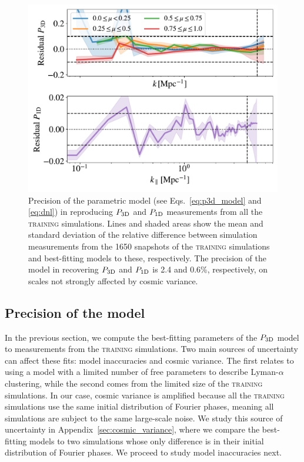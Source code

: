 \documentclass{aa}
\newcommand{\lya}{Lyman-$\alpha$\xspace}
\newcommand{\poned}{\ensuremath{P_{\rm 1D}}\xspace}
\newcommand{\pthreed}{\ensuremath{P_{\rm 3D}}\xspace}
\newcommand{\lacehc}{\textsc{training}\xspace}
\begin{document}
\begin{figure}
\includegraphics[width=\columnwidth]{figures/goodness_fit_all.pdf}
\centering
\caption{Precision of the parametric model (see Eqs.~\ref{eq:p3d_model} and \ref{eq:dnl}) in reproducing \pthreed and \poned measurements from all the \lacehc simulations. Lines and shaded areas show the mean and standard deviation of the relative difference between simulation measurements from the 1650 snapshots of the \lacehc simulations and best-fitting models to these, respectively. The precision of the model in recovering \pthreed and \poned is 2.4 and 0.6\%, respectively, on scales not strongly affected by cosmic variance.}
\label{fig:goodness}
\end{figure}

\subsection{Precision of the model}
\label{sec:input_precision}

In the previous section, we compute the best-fitting parameters of the \pthreed model to measurements from the \lacehc simulations. Two main sources of uncertainty can affect these fits: model inaccuracies and cosmic variance. The first relates to using a model with a limited number of free parameters to describe \lya clustering, while the second comes from the limited size of the \lacehc simulations. In our case, cosmic variance is amplified because all the \lacehc simulations use the same initial distribution of Fourier phases, meaning all simulations are subject to the same large-scale noise. We study this source of uncertainty in Appendix~\ref{sec:cosmic_variance}, where we compare the best-fitting models to two simulations whose only difference is in their initial distribution of Fourier phases. We proceed to study model inaccuracies next.
\end{document}
